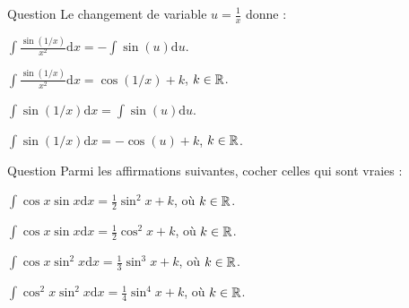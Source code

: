 \begin{multi}[multiple,feedback=
{Avec \(\displaystyle u=\frac{1}{x}\), on aura : \(\displaystyle \mathrm{d}u=\frac{-\mathrm{d}x}{x^2}\). D'où
\[\int \frac{\sin (1/x)}{x^2}\mathrm{d}x=-\int \sin (u)\mathrm{d}u=\cos (u)+k=\cos\left(1/x\right)+k,\; k\in \Rr.\]
}]{Question}
Le changement de variable \(\displaystyle u=\frac{1}{x}\) donne :

    \item* \(\displaystyle \int \frac{\sin (1/x)}{x^2}\mathrm{d}x=-\int \sin (u)\mathrm{d}u\).
    \item* \(\displaystyle \int \frac{\sin (1/x)}{x^2}\mathrm{d}x=\cos\left(1/x\right)+k\), \(k\in \mathbb{R}\).
    \item \(\displaystyle \int \sin (1/x)\mathrm{d}x=\int \sin (u)\mathrm{d}u\).
    \item \(\displaystyle \int \sin (1/x)\mathrm{d}x=-\cos (u)+k\), \(k\in \mathbb{R}\).
\end{multi}


\begin{multi}[multiple,feedback=
{Avec \(u=\sin x\), on a : \(\mathrm{d}u=\cos x\mathrm{d}x\),
\[\int \cos x\sin x\mathrm{d}x=\int u\mathrm{d}u=\frac{1}{2}u^2+k=\frac{1}{2}\sin ^2x+k,\; k\in \Rr,\]
et
\[\int \cos x\sin ^2x\mathrm{d}x=\int u^2\mathrm{d}u=\frac{1}{3}u^3+k=\frac{1}{3}\sin ^3x+k,\; k\in \Rr.\]
}]{Question}
Parmi les affirmations suivantes, cocher celles qui sont vraies :

    \item* \(\displaystyle \int \cos x\sin x\mathrm{d}x=\frac{1}{2}\sin ^2x+k\), où \(k\in \mathbb{R}\).
    \item \(\displaystyle \int \cos x\sin x\mathrm{d}x=\frac{1}{2}\cos ^2x+k\), où \(k\in \mathbb{R}\).
    \item* \(\displaystyle \int \cos x\sin ^2x\mathrm{d}x=\frac{1}{3}\sin ^3x+k\), où \(k\in \mathbb{R}\).
    \item \(\displaystyle \int \cos ^2x\sin ^2x\mathrm{d}x=\frac{1}{4}\sin ^4x+k\), où \(k\in \mathbb{R}\).
\end{multi}


